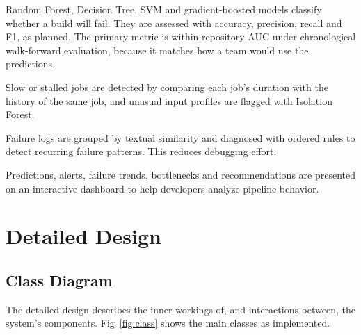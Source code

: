 Random Forest, Decision Tree, SVM and gradient-boosted models classify whether a build will fail. They are assessed with accuracy, precision, recall and F1, as planned. The primary metric is within-repository AUC under chronological walk-forward evaluation, because it matches how a team would use the predictions.

Slow or stalled jobs are detected by comparing each job's duration with the history of the same job, and unusual input profiles are flagged with Isolation Forest.

Failure logs are grouped by textual similarity and diagnosed with ordered rules to detect recurring failure patterns. This reduces debugging effort.

Predictions, alerts, failure trends, bottlenecks and recommendations are presented on an interactive dashboard to help developers analyze pipeline behavior.

\section{Detailed Design}
\label{sec:detailed}

\subsection{Class Diagram}
\label{sec:class}
The detailed design describes the inner workings of, and interactions between, the system's components. Fig~\ref{fig:class} shows the main classes as implemented.

